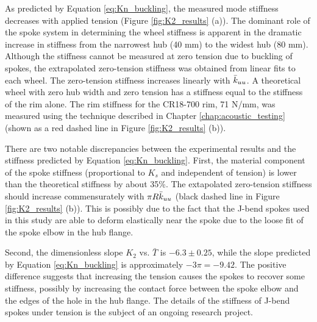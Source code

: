 \documentclass[\rootdir/thesis.tex]{subfiles}
\begin{document}
As predicted by Equation \eqref{eq:Kn_buckling}, the measured mode stiffness decreases with applied tension (Figure \ref{fig:K2_results} (a)). The dominant role of the spoke system in determining the wheel stiffness is apparent in the dramatic increase in stiffness from the narrowest hub (40 mm) to the widest hub (80 mm). Although the stiffness cannot be measured at zero tension due to buckling of spokes, the extrapolated zero-tension stiffness was obtained from linear fits to each wheel. The zero-tension stiffness increases linearly with $\bar{k}_{uu}$. A theoretical wheel with zero hub width and zero tension has a stiffness equal to the stiffness of the rim alone. The rim stiffness for the CR18-700 rim, 71 N/mm, was measured using the technique described in Chapter \ref{chap:acoustic_testing} (shown as a red dashed line in Figure \ref{fig:K2_results} (b)).

There are two notable discrepancies between the experimental results and the stiffness predicted by Equation \eqref{eq:Kn_buckling}. First, the material component of the spoke stiffness (proportional to $K_s$ and independent of tension) is lower than the theoretical stiffness by about 35\%. The extapolated zero-tension stiffness should increase commensurately with $\pi R\bar{k}_{uu}$ (black dashed line in Figure \ref{fig:K2_results} (b)). This is possibly due to the fact that the J-bend spokes used in this study are able to deform elastically near the spoke due to the loose fit of the spoke elbow in the hub flange.

Second, the dimensionless slope $K_2$ vs. $\bar{T}$ is $-6.3 \pm 0.25$, while the slope predicted by Equation \eqref{eq:Kn_buckling} is approximately $-3\pi = -9.42$. The positive difference suggests that increasing the tension causes the spokes to recover some stiffness, possibly by increasing the contact force between the spoke elbow and the edges of the hole in the hub flange. The details of the stiffness of J-bend spokes under tension is the subject of an ongoing research project.
\end{document}
